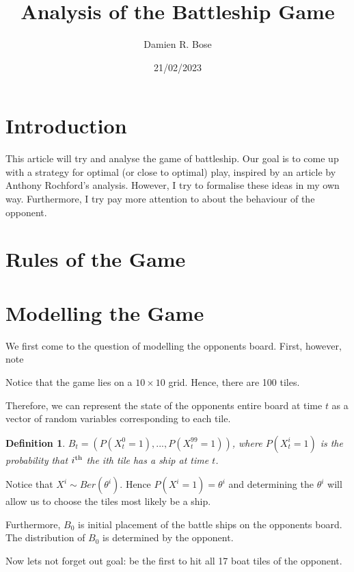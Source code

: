 \documentclass[11pt]{article}
\newtheorem{definition}{Definition}
\begin{document}
\title{Analysis of the Battleship Game}
\author{Damien R. Bose}
\date{21/02/2023}

\maketitle

\section{Introduction}

This article will try and analyse the game of battleship. Our goal is to come up with a strategy for optimal (or close to optimal) play, inspired by an article by Anthony Rochford's analysis\cite{rochford}. However, I try to formalise these ideas in my own way. Furthermore, I try pay more attention to about the behaviour of the opponent. 

\section{Rules of the Game}

\section{Modelling the Game}

We first come to the question of modelling the opponents board. First, however, note


Notice that the game lies on a $10 \times 10$ grid. Hence, there are 100 tiles.

Therefore, we can represent the state of the opponents entire board at time $t$ as a vector of random variables corresponding to each tile.

\begin{definition}
 $B_t =(P(X_t^0 = 1),...,P(X_t^{99} = 1))$, where $P(X_t^i = 1)$ is the probability that $i\textsuperscript{th}$ the ith tile has a ship at time $t$.
\end{definition}

Notice that $X^i \sim Ber(\theta^i)$. Hence $P(X^i = 1) = \theta^i$ and determining the $\theta^i$ will allow us to choose the tiles most likely be a ship.

Furthermore, $B_0$ is initial placement of the battle ships on the opponents board. The distribution of $B_0$ is determined by the opponent. 

Now lets not forget out goal: be the first to hit all 17 boat tiles of the opponent. 
\end{document}
